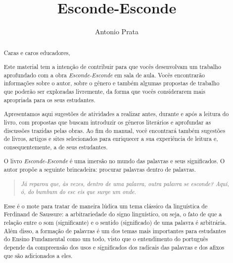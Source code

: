 \documentclass[11pt]{extarticle}
\newcommand{\AutorLivro}{Antonio Prata}
\newcommand{\TituloLivro}{Esconde-Esconde}
\newcommand{\colaborador}{Gabriela Karam}
\begin{document}
\title{\TituloLivro}
\author{\AutorLivro}
\def\authornotes{\colaborador}

\date{}
\maketitle


\tableofcontents


\begin{abstract}

Caras e caros educadores,

Este material tem a intenção de contribuir para que vocês desenvolvam um trabalho aprofundado com a obra \textit{Esconde-Esconde} em sala de aula.
Vocês encontrarão informações sobre o autor, sobre o gênero e também 
algumas propostas de trabalho que poderão ser exploradas livremente, 
da forma que vocês considerarem mais apropriada para os seus estudantes.

Apresentamos aqui sugestões de atividades a realizar antes, durante e após a leitura do livro, com propostas que buscam introduzir os gêneros literários e aprofundar as discussões trazidas pelas obras. Ao fim do manual, você encontrará também sugestões de livros, artigos e sites selecionados para enriquecer a sua experiência de leitura e, consequentemente, a de seus estudantes.


O livro \textit{Esconde-Esconde} é uma imersão no mundo das palavras e seus significados. O autor propõe a seguinte brincadeira: procurar palavras dentro de palavras.

\begin{quote}

\textit{Já reparou que, às vezes, dentro de uma palavra, outra palavra se esconde? Aqui, ó, do bumbum do esc eis que surge um onde.}

\end{quote}

Esse é o mote para tratar de maneira lúdica um tema clássico da linguística de Ferdinand de Saussure: a arbitrariedade do signo linguístico, ou seja, o fato de que a relação entre o som (significante) e o sentido (significado) de uma palavra é arbitrária. Além disso, a formação de palavras é um dos temas mais importantes para estudantes do Ensino Fundamental como um todo, visto que o entendimento do português depende da compreensão dos usos e significados dos radicais das palavras e dos afixos que são adicionados a eles. 


\end{abstract}
\end{document}
